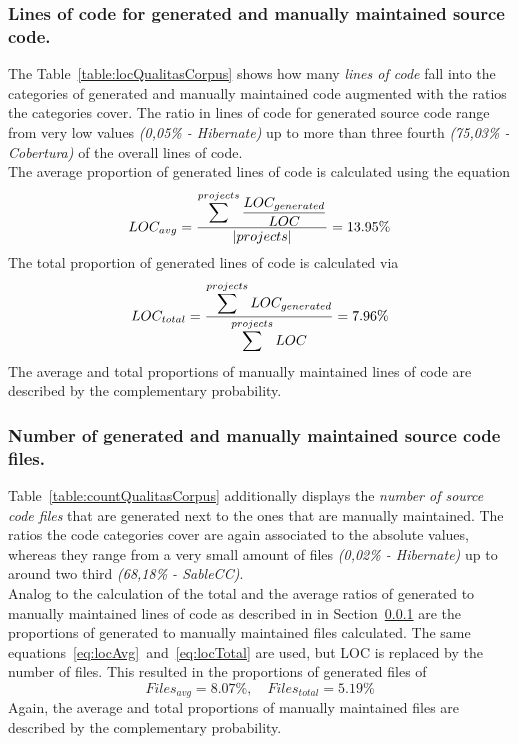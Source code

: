 \subsubsection{Lines of code for generated and manually maintained source code.}
\label{section:qualitasCorpusLOC}
The Table~\ref{table:locQualitasCorpus} shows how many \textit{lines of code} fall into the categories of generated and manually maintained code augmented with the ratios the categories cover. The ratio in lines of code for generated source code range from very low values \textit{(0,05\% - Hibernate)} up to more than three fourth \textit{(75,03\% - Cobertura)} of the overall lines of code.\\
The average proportion of generated lines of code is calculated using the equation
\begin{equation}
	\label{eq:locAvg}
	LOC_{avg} = \frac{\mathlarger{\sum^{projects} \frac{LOC_{generated}}{LOC}}}{|projects|} = 13.95\%
\end{equation}
The total proportion of generated lines of code is calculated via
\begin{equation}
	\label{eq:locTotal}
	LOC_{total} = \frac{\mathlarger{\sum^{projects} LOC_{generated}}}{\mathlarger{\sum^{projects} LOC}} = 7.96\%
\end{equation} 
The average and total proportions of manually maintained lines of code are described by the complementary probability.



\subsubsection{Number of generated and manually maintained source code files.}
Table~\ref{table:countQualitasCorpus} additionally displays the \textit{number of source code files} that are generated next to the ones that are manually maintained. The ratios the code categories cover are again associated to the absolute values, whereas they range from a very small amount of files \textit{(0,02\% - Hibernate)} up to around two third \textit{(68,18\% - SableCC)}.\\
Analog to the calculation of the total and the average ratios of generated to manually maintained lines of code as described in in Section~\ref{section:qualitasCorpusLOC} are the proportions of generated to manually maintained files calculated. The same equations~\ref{eq:locAvg}~and~\ref{eq:locTotal} are used, but LOC is replaced by the number of files. %
This resulted in the proportions of generated files of
\begin{equation}
	Files_{avg} = 8.07\%, \quad Files_{total} = 5.19\%
\end{equation} 
Again, the average and total proportions of manually maintained files are described by the complementary probability.


